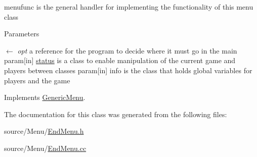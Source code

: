 menufunc is the general handler for implementing the functionality of this menu class 
\begin{DoxyParams}{Parameters}
\item[\mbox{$\leftarrow$} {\em opt}]a reference for the program to decide where it must go in the main param\mbox{[}in\mbox{]} \hyperlink{classstatus}{status} is a class to enable manipulation of the current game and players between classes param\mbox{[}in\mbox{]} info is the class that holds global variables for players and the game \end{DoxyParams}


Implements \hyperlink{classGenericMenu_a290ad7ec3331edc968190b1d7b48a397}{GenericMenu}.

The documentation for this class was generated from the following files:\begin{DoxyCompactItemize}
\item 
source/Menu/\hyperlink{EndMenu_8h}{EndMenu.h}\item 
source/Menu/\hyperlink{EndMenu_8cc}{EndMenu.cc}\end{DoxyCompactItemize}
